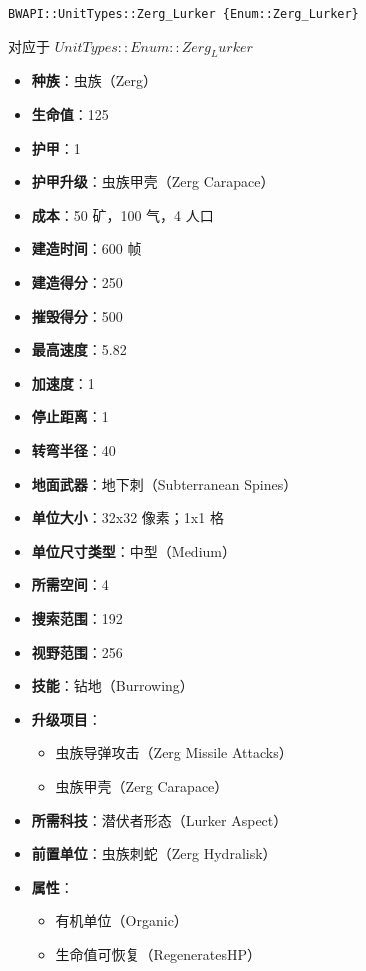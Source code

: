 \begin{tcolorbox}[colback=white, colframe=black!60!white, title=Zerg\_Lurker(), arc=0mm]
    \begin{verbatim}
BWAPI::UnitTypes::Zerg_Lurker {Enum::Zerg_Lurker}
    \end{verbatim}
    对应于  $ UnitTypes::Enum::Zerg_Lurker $ 
    \begin{itemize}
        \item \textbf{种族}：虫族（Zerg）
        \item \textbf{生命值}：125
        \item \textbf{护甲}：1
        \item \textbf{护甲升级}：虫族甲壳（Zerg Carapace）
        \item \textbf{成本}：50 矿，100 气，4 人口
        \item \textbf{建造时间}：600 帧
        \item \textbf{建造得分}：250
        \item \textbf{摧毁得分}：500
        \item \textbf{最高速度}：5.82
        \item \textbf{加速度}：1
        \item \textbf{停止距离}：1
        \item \textbf{转弯半径}：40
        \item \textbf{地面武器}：地下刺（Subterranean Spines）
        \item \textbf{单位大小}：32x32 像素；1x1 格
        \item \textbf{单位尺寸类型}：中型（Medium）
        \item \textbf{所需空间}：4
        \item \textbf{搜索范围}：192
        \item \textbf{视野范围}：256
        \item \textbf{技能}：钻地（Burrowing）
        \item \textbf{升级项目}：
            \begin{itemize}
                \item 虫族导弹攻击（Zerg Missile Attacks）
                \item 虫族甲壳（Zerg Carapace）
            \end{itemize}
        \item \textbf{所需科技}：潜伏者形态（Lurker Aspect）
        \item \textbf{前置单位}：虫族刺蛇（Zerg Hydralisk）
        \item \textbf{属性}：
            \begin{itemize}
                \item 有机单位（Organic）
                \item 生命值可恢复（RegeneratesHP）
            \end{itemize}
    \end{itemize}
\end{tcolorbox}


